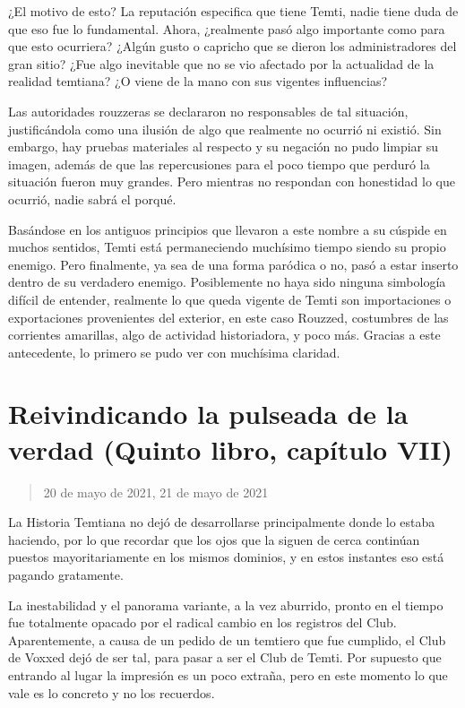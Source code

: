 \documentclass[
]{book}
\begin{document}
¿El motivo de esto? La reputación especifica que tiene Temti, nadie tiene duda de que eso fue lo fundamental. Ahora, ¿realmente pasó algo importante como para que esto ocurriera? ¿Algún gusto o capricho que se dieron los administradores del gran sitio? ¿Fue algo inevitable que no se vio afectado por la actualidad de la realidad temtiana? ¿O viene de la mano con sus vigentes influencias?

Las autoridades rouzzeras se declararon no responsables de tal situación, justificándola como una ilusión de algo que realmente no ocurrió ni existió. Sin embargo, hay pruebas materiales al respecto y su negación no pudo limpiar su imagen, además de que las repercusiones para el poco tiempo que perduró la situación fueron muy grandes. Pero mientras no respondan con honestidad lo que ocurrió, nadie sabrá el porqué.

Basándose en los antiguos principios que llevaron a este nombre a su cúspide en muchos sentidos, Temti está permaneciendo muchísimo tiempo siendo su propio enemigo. Pero finalmente, ya sea de una forma paródica o no, pasó a estar inserto dentro de su verdadero enemigo. Posiblemente no haya sido ninguna simbología difícil de entender, realmente lo que queda vigente de Temti son importaciones o exportaciones provenientes del exterior, en este caso Rouzzed, costumbres de las corrientes amarillas, algo de actividad historiadora, y poco más. Gracias a este antecedente, lo primero se pudo ver con muchísima claridad.

\hypertarget{reivindicando-la-pulseada-de-la-verdad-quinto-libro-capuxedtulo-vii}{%
\section{Reivindicando la pulseada de la verdad (Quinto libro, capítulo VII)}\label{reivindicando-la-pulseada-de-la-verdad-quinto-libro-capuxedtulo-vii}}

\begin{quote}
20 de mayo de 2021, 21 de mayo de 2021
\end{quote}

La Historia Temtiana no dejó de desarrollarse principalmente donde lo estaba haciendo, por lo que recordar que los ojos que la siguen de cerca continúan puestos mayoritariamente en los mismos dominios, y en estos instantes eso está pagando gratamente.

La inestabilidad y el panorama variante, a la vez aburrido, pronto en el tiempo fue totalmente opacado por el radical cambio en los registros del Club. Aparentemente, a causa de un pedido de un temtiero que fue cumplido, el Club de Voxxed dejó de ser tal, para pasar a ser el Club de Temti. Por supuesto que entrando al lugar la impresión es un poco extraña, pero en este momento lo que vale es lo concreto y no los recuerdos.
\end{document}
